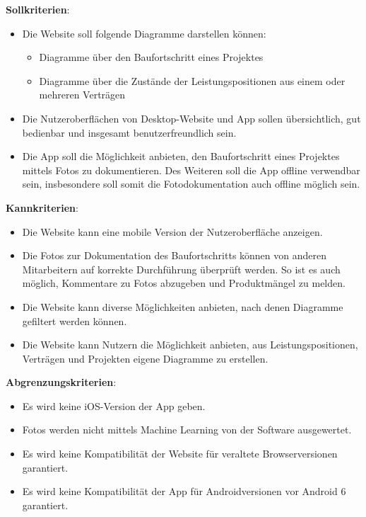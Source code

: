 \noindent \textbf{Sollkriterien}:
\begin{itemize}
	\item Die Website soll folgende Diagramme darstellen können:
		\begin{itemize}
		\item Diagramme über den Baufortschritt eines Projektes
		\item Diagramme über die Zustände der Leistungspositionen aus einem oder mehreren Verträgen
		\end{itemize}
	\item Die Nutzeroberflächen von Desktop-Website und App sollen übersichtlich, gut bedienbar und insgesamt benutzerfreundlich sein.
	\item Die App soll die Möglichkeit anbieten, den Baufortschritt eines Projektes mittels Fotos zu dokumentieren.
	Des Weiteren soll die App offline verwendbar sein, insbesondere soll somit die Fotodokumentation auch offline möglich sein.
\end{itemize}

\noindent \textbf{Kannkriterien}:
\begin{itemize}
	\item Die Website kann eine mobile Version der Nutzeroberfläche anzeigen.
	\item Die Fotos zur Dokumentation des Baufortschritts können von anderen Mitarbeitern auf korrekte Durchführung überprüft werden.
	So ist es auch möglich, Kommentare zu Fotos abzugeben und Produktmängel zu melden.
	\item Die Website kann diverse Möglichkeiten anbieten, nach denen Diagramme gefiltert werden können.
	\item Die Website kann Nutzern die Möglichkeit anbieten, aus Leistungspositionen, Verträgen und Projekten eigene Diagramme zu erstellen.
\end{itemize}

\noindent \textbf{Abgrenzungskriterien}:
\begin{itemize}
	\item Es wird keine iOS-Version der App geben.
	\item Fotos werden nicht mittels Machine Learning von der Software ausgewertet.
	\item Es wird keine Kompatibilität der Website für veraltete Browserversionen garantiert.
	\item Es wird keine Kompatibilität der App für Androidversionen vor Android 6 garantiert.
\end{itemize}